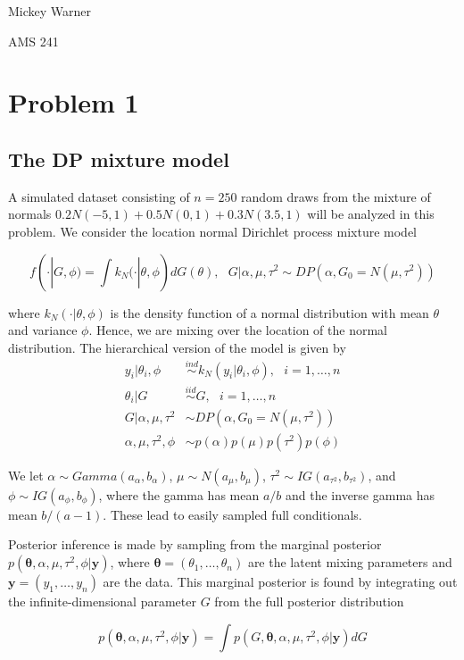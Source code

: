 \documentclass[12pt]{article}
\newcommand{\m}[1]{\mathbf{\bm{#1}}}
\begin{document}
\noindent Mickey Warner

\noindent AMS 241

\section*{Problem 1}

\subsection*{The DP mixture model}

A simulated dataset consisting of $n=250$ random draws from the mixture of normals $0.2N(-5, 1)+0.5N(0,1)+0.3N(3.5,1)$ will be analyzed in this problem. We consider the location normal Dirichlet process mixture model

\[ f(\cdot|G, \phi) = \int k_N(\cdot|\theta, \phi)dG(\theta),~~~G|\alpha,\mu,\tau^2\sim DP(\alpha, G_0=N(\mu,\tau^2)) \]

\noindent where $k_N(\cdot|\theta,\phi)$ is the density function of a normal distribution with mean $\theta$ and variance $\phi$. Hence, we are mixing over the location of the normal distribution. The hierarchical version of the model is given by 
\begin{align*}
y_i|\theta_i,\phi &\overset{ind}\sim k_N(y_i|\theta_i,\phi),~~~i=1,\ldots,n \\
\theta_i|G &\overset{iid}\sim G,~~~i=1,\ldots,n \\
G|\alpha,\mu,\tau^2 &\sim DP(\alpha, G_0=N(\mu,\tau^2)) \\
\alpha,\mu,\tau^2,\phi &\sim p(\alpha)p(\mu)p(\tau^2)p(\phi) 
\end{align*}

\noindent We let $\alpha\sim Gamma(a_\alpha, b_\alpha)$, $\mu\sim N(a_\mu, b_\mu)$, $\tau^2\sim IG(a_{\tau^2}, b_{\tau^2})$, and $\phi\sim IG(a_\phi, b_\phi)$, where the gamma has mean $a/b$ and the inverse gamma has mean $b/(a-1)$. These lead to easily sampled full conditionals.

Posterior inference is made by sampling from the marginal posterior $p(\m{\theta},\alpha,\mu,\tau^2,\phi|\m{y})$, where $\m{\theta}=(\theta_1,\ldots,\theta_n)$ are the latent mixing parameters and $\m{y}=(y_1,\ldots,y_n)$ are the data. This marginal posterior is found by integrating out the infinite-dimensional parameter $G$ from the full posterior distribution

\[p(\m{\theta},\alpha,\mu,\tau^2,\phi|\m{y}) = \int p(G,\m{\theta},\alpha,\mu,\tau^2,\phi|\m{y})dG \]
\end{document}

